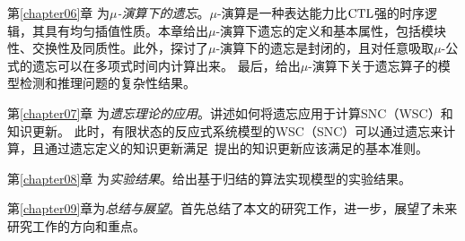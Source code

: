 第\ref{chapter06}章 为{\em $\mu$-演算下的遗忘}。$\mu$-演算是一种表达能力比$\textrm{CTL}$强的时序逻辑，其具有均匀插值性质。本章给出$\mu$-演算下遗忘的定义和基本属性，包括模块性、交换性及同质性。此外，探讨了$\mu$-演算下的遗忘是封闭的，且对任意吸取$\mu$-公式的遗忘可以在多项式时间内计算出来。
最后，给出$\mu$-演算下关于遗忘算子的模型检测和推理问题的复杂性结果。



第\ref{chapter07}章 为\textit{遗忘理论的应用}。讲述如何将遗忘应用于计算SNC（WSC）和知识更新。
此时，有限状态的反应式系统模型的WSC（SNC）可以通过遗忘来计算，且通过遗忘定义的知识更新满足~\citeauthor{katsuno91mendelzon}提出的知识更新应该满足的基本准则。

第\ref{chapter08}章 为\textit{实验结果}。给出基于归结的算法实现模型的实验结果。


第\ref{chapter09}章为\textit{总结与展望}。首先总结了本文的研究工作，进一步，展望了未来研究工作的方向和重点。
